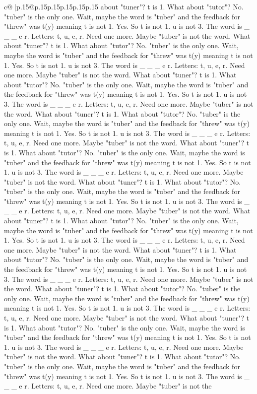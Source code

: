 \documentclass{article}
\begin{document}
{\begin{supertabular}{c@{$\;$}|p{.15\linewidth}@{}p{.15\linewidth}p{.15\linewidth}p{.15\linewidth}p{.15\linewidth}p{.15\linewidth}}
{{{about "tuner"? t is 1. What about "tutor"? No. "tuber" is the only one. Wait, maybe the word is "tuber" and the feedback for "threw" was t(y) meaning t is not 1. Yes. So t is not 1. u is not 3. The word is \_ \_ \_ e r. Letters: t, u, e, r. Need one more. Maybe "tuber" is not the word. What about "tuner"? t is 1. What about "tutor"? No. "tuber" is the only one. Wait, maybe the word is "tuber" and the feedback for "threw" was t(y) meaning t is not 1. Yes. So t is not 1. u is not 3. The word is \_ \_ \_ e r. Letters: t, u, e, r. Need one more. Maybe "tuber" is not the word. What about "tuner"? t is 1. What about "tutor"? No. "tuber" is the only one. Wait, maybe the word is "tuber" and the feedback for "threw" was t(y) meaning t is not 1. Yes. So t is not 1. u is not 3. The word is \_ \_ \_ e r. Letters: t, u, e, r. Need one more. Maybe "tuber" is not the word. What about "tuner"? t is 1. What about "tutor"? No. "tuber" is the only one. Wait, maybe the word is "tuber" and the feedback for "threw" was t(y) meaning t is not 1. Yes. So t is not 1. u is not 3. The word is \_ \_ \_ e r. Letters: t, u, e, r. Need one more. Maybe "tuber" is not the word. What about "tuner"? t is 1. What about "tutor"? No. "tuber" is the only one. Wait, maybe the word is "tuber" and the feedback for "threw" was t(y) meaning t is not 1. Yes. So t is not 1. u is not 3. The word is \_ \_ \_ e r. Letters: t, u, e, r. Need one more. Maybe "tuber" is not the word. What about "tuner"? t is 1. What about "tutor"? No. "tuber" is the only one. Wait, maybe the word is "tuber" and the feedback for "threw" was t(y) meaning t is not 1. Yes. So t is not 1. u is not 3. The word is \_ \_ \_ e r. Letters: t, u, e, r. Need one more. Maybe "tuber" is not the word. What about "tuner"? t is 1. What about "tutor"? No. "tuber" is the only one. Wait, maybe the word is "tuber" and the feedback for "threw" was t(y) meaning t is not 1. Yes. So t is not 1. u is not 3. The word is \_ \_ \_ e r. Letters: t, u, e, r. Need one more. Maybe "tuber" is not the word. What about "tuner"? t is 1. What about "tutor"? No. "tuber" is the only one. Wait, maybe the word is "tuber" and the feedback for "threw" was t(y) meaning t is not 1. Yes. So t is not 1. u is not 3. The word is \_ \_ \_ e r. Letters: t, u, e, r. Need one more. Maybe "tuber" is not the word. What about "tuner"? t is 1. What about "tutor"? No. "tuber" is the only one. Wait, maybe the word is "tuber" and the feedback for "threw" was t(y) meaning t is not 1. Yes. So t is not 1. u is not 3. The word is \_ \_ \_ e r. Letters: t, u, e, r. Need one more. Maybe "tuber" is not the word. What about "tuner"? t is 1. What about "tutor"? No. "tuber" is the only one. Wait, maybe the word is "tuber" and the feedback for "threw" was t(y) meaning t is not 1. Yes. So t is not 1. u is not 3. The word is \_ \_ \_ e r. Letters: t, u, e, r. Need one more. Maybe "tuber" is not the word. What about "tuner"? t is 1. What about "tutor"? No. "tuber" is the only one. Wait, maybe the word is "tuber" and the feedback for "threw" was t(y) meaning t is not 1. Yes. So t is not 1. u is not 3. The word is \_ \_ \_ e r. Letters: t, u, e, r. Need one more. Maybe "tuber" is not the }}}
\end{supertabular}}
\end{document}
